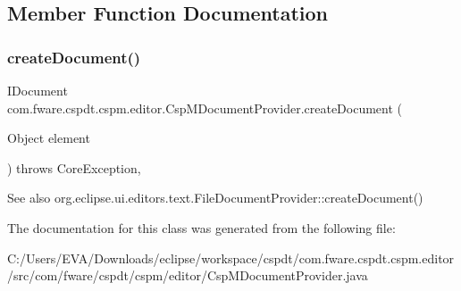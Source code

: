 \subsection{Member Function Documentation}
\mbox{\label{classcom_1_1fware_1_1cspdt_1_1cspm_1_1editor_1_1_csp_m_document_provider_aee079461064a45daaf96dcfd68df8ea1}} 
\subsubsection{\texorpdfstring{create\+Document()}{createDocument()}}
{\footnotesize\ttfamily I\+Document com.\+fware.\+cspdt.\+cspm.\+editor.\+Csp\+M\+Document\+Provider.\+create\+Document (\begin{DoxyParamCaption}\item[{Object}]{element }\end{DoxyParamCaption}) throws Core\+Exception\hspace{0.3cm}{\ttfamily [inline]}, {\ttfamily [protected]}}

\begin{DoxySeeAlso}{See also}
org.\+eclipse.\+ui.\+editors.\+text.\+File\+Document\+Provider\+::create\+Document() 
\end{DoxySeeAlso}


The documentation for this class was generated from the following file\+:\begin{DoxyCompactItemize}
\item 
C\+:/\+Users/\+E\+V\+A/\+Downloads/eclipse/workspace/cspdt/com.\+fware.\+cspdt.\+cspm.\+editor/src/com/fware/cspdt/cspm/editor/Csp\+M\+Document\+Provider.\+java\end{DoxyCompactItemize}
